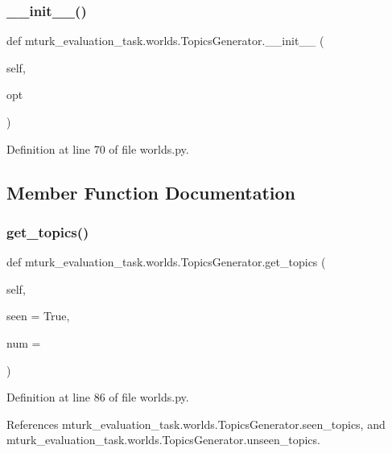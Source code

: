 \subsubsection{\texorpdfstring{\+\_\+\+\_\+init\+\_\+\+\_\+()}{\_\_init\_\_()}}
{\footnotesize\ttfamily def mturk\+\_\+evaluation\+\_\+task.\+worlds.\+Topics\+Generator.\+\_\+\+\_\+init\+\_\+\+\_\+ (\begin{DoxyParamCaption}\item[{}]{self,  }\item[{}]{opt }\end{DoxyParamCaption})}



Definition at line 70 of file worlds.\+py.



\subsection{Member Function Documentation}
\mbox{\label{classmturk__evaluation__task_1_1worlds_1_1TopicsGenerator_a15079ca215356b506ead5a1aa34f54eb}} 
\subsubsection{\texorpdfstring{get\+\_\+topics()}{get\_topics()}}
{\footnotesize\ttfamily def mturk\+\_\+evaluation\+\_\+task.\+worlds.\+Topics\+Generator.\+get\+\_\+topics (\begin{DoxyParamCaption}\item[{}]{self,  }\item[{}]{seen = {\ttfamily True},  }\item[{}]{num = {} }\end{DoxyParamCaption})}



Definition at line 86 of file worlds.\+py.



References mturk\+\_\+evaluation\+\_\+task.\+worlds.\+Topics\+Generator.\+seen\+\_\+topics, and mturk\+\_\+evaluation\+\_\+task.\+worlds.\+Topics\+Generator.\+unseen\+\_\+topics.

